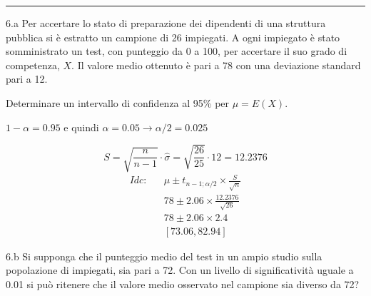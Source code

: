 \documentclass[
  11pt,
]{book}
\theoremstyle{mytheoremstyle}
\theoremstyle{mydefstyle}
\newenvironment{sol}
  {
  \begin{tcolorbox}[enhanced,breakable,arc=0.1mm,boxrule=1pt,colback=white,colframe=iblue,
  title=\bf \fontfamily{lmss}\selectfont \hspace{.5 cm} Soluzione,drop fuzzy shadow]

}{
\end{tcolorbox}
  }
\begin{document}
\begin{center}\rule{0.5\linewidth}{0.5pt}\end{center}

6.a Per accertare lo stato di preparazione dei dipendenti di una
struttura pubblica si è estratto un campione di 26 impiegati.
A ogni impiegato è stato somministrato un test, con
punteggio da 0 a 100, per accertare il suo grado di competenza, \(X\).
Il valore medio ottenuto è pari a 78 con una deviazione
standard pari a 12.

Determinare un intervallo di confidenza
al 95\% per \(\mu = E(X)\).

\begin{sol}
\(1-\alpha =0.95\) e quindi \(\alpha=0.05\rightarrow \alpha/2=0.025\)

\[
      S  =\sqrt{\frac {n}{n-1}}\cdot\hat\sigma =
     \sqrt{\frac { 26 }{ 25 }}\cdot 12 = 12.2376 
\]
\begin{eqnarray*}
  Idc: & &  \hat\mu \pm  t_{n-1;\alpha/2} \times \frac{S}{\sqrt{n}} \\
     & &  78 \pm  2.06 \times \frac{ 12.2376 }{\sqrt{ 26 }} \\
     & &  78 \pm  2.06 \times  2.4 \\
     & & [ 73.06 ,  82.94 ]
\end{eqnarray*}

\end{sol}

6.b Si supponga che il punteggio medio del test in un ampio
studio sulla popolazione di impiegati, sia pari a 72.
Con un livello di significatività uguale a 0.01 si può
ritenere che il valore medio osservato nel campione sia
diverso da 72?
\end{document}
